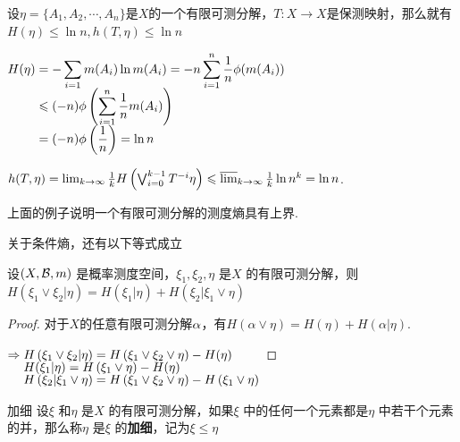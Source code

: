 \begin{instance}
    设$\eta=\{A_1,A_2,\cdots,A_n\}$是$X$的一个有限可测分解，$T:X\to X$是保测映射，那么就有$H(\eta)\leq\ln{n},h(T,\eta)\leq\ln{n}$
    \begin{solution}
        $\setjot[-2]\begin{aligned}[t]
            H(\eta) &=-\sum_{i=1}{m(A_i)\ln{m(A_i)}}=-n\sum_{i=1}^n{\frac{1}{n}\phi(m(A_i))} \\
            &\leq (-n)\phi \left(\sum_{i=1}^n\frac{1}{n}m(A_i)\right) \\
            &=(-n)\phi\left(\frac{1}{n}\right)=\ln{n}
        \end{aligned}$\par
        $h(T,\eta)=\lim_{k\to\infty}{\frac{1}{k}H\left(\bigvee_{i=0}^{k-1}T^{-i}\eta\right)}\leq\varlimsup_{k\to\infty}{\frac{1}{k}\ln{n^k}}=\ln n$.
    \end{solution}
\end{instance}
上面的例子说明一个有限可测分解的测度熵具有上界.

关于条件熵，还有以下等式成立
\begin{lemma}{}
    设$(X,\mcal{B},m)$ 是概率测度空间，$\xi_1,\xi_2,\eta$ 是$X$ 的有限可测分解，则$H \left(\xi_1\vee\xi_2|\eta\right)=H(\xi_1|\eta)+H(\xi_2|\xi_1\vee\eta)$
\end{lemma}
\begin{proof}
    对于$X$的任意有限可测分解$\a$，有$H(\alpha\vee\eta)=H(\eta)+H(\alpha|\eta)$.\par
    $\Rightarrow \setjot[-2]\begin{aligned}[t]
        &H\left(\xi_1\vee\xi_2|\eta\right)=H\left(\xi_1\vee\xi_2\vee\eta\right)-H(\eta)\\
        &H(\xi_1|\eta)=H\left(\xi_1\vee\eta\right) - H(\eta) \\
        &H\left(\xi_2|\xi_1\vee\eta\right)=H\left(\xi_1\vee\xi_2\vee\eta\right)-H\left(\xi_1\vee\eta\right) \\
    \end{aligned}$
\end{proof}

\begin{definition}{加细}
    设$\xi$ 和$\eta$ 是$X$ 的有限可测分解，如果$\xi$ 中的任何一个元素都是$\eta$ 中若干个元素的并，那么称$\eta$ 是$\xi$ 的\textbf{加细}，记为$\xi\leq\eta$
\end{definition}

